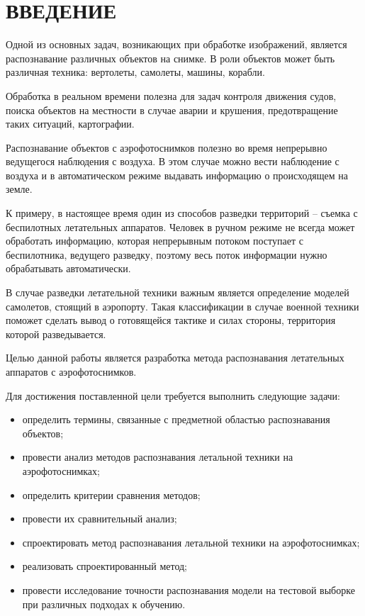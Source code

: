 \chapter*{ВВЕДЕНИЕ}

Одной из основных задач, возникающих при обработке изображений, является распознавание различных объектов на снимке. В роли объектов может быть различная техника: вертолеты, самолеты, машины, корабли.

Обработка в реальном времени полезна для задач контроля движения судов, поиска объектов на местности в случае аварии и крушения, предотвращение таких ситуаций, картографии.

Распознавание объектов с аэрофотоснимков полезно во время непрерывно ведущегося наблюдения с воздуха. В этом случае можно вести наблюдение с воздуха и в автоматическом режиме выдавать информацию о происходящем на земле.

К примеру, в настоящее время один из способов разведки территорий -- съемка с беспилотных летательных аппаратов. Человек в ручном режиме не всегда может обработать информацию, которая непрерывным потоком поступает с беспилотника, ведущего разведку, поэтому весь поток информации нужно обрабатывать автоматически. 

В случае разведки летательной техники важным является определение моделей самолетов, стоящий в аэропорту. Такая классификации в случае военной техники поможет сделать вывод о готовящейся тактике и силах стороны, территория которой разведывается.

Целью данной работы является разработка метода распознавания летательных аппаратов с аэрофотоснимков.

Для достижения поставленной цели требуется выполнить следующие задачи:
\begin{itemize}
	\item определить термины, связанные с предметной областью распознавания объектов;
	\item провести анализ методов распознавания летальной техники на аэрофотоснимках;
	\item определить критерии сравнения методов;
	\item провести их сравнительный анализ;
	\item спроектировать метод распознавания летальной техники на аэрофотоснимках;
	\item реализовать спроектированный метод;
	\item провести исследование точности распознавания модели на тестовой выборке при различных подходах к обучению.
\end{itemize}